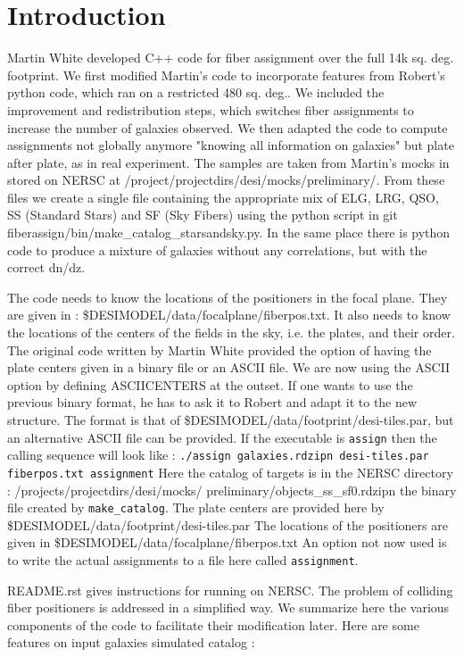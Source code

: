 \documentclass[10pt]{extarticle}
\begin{document}
\section{Introduction}
\begin{multicols}{2}
Martin White developed C++ code for fiber assignment over the full 14k sq. deg. footprint.  We first modified Martin's code to incorporate features from Robert's python code, which ran on a restricted 480 sq. deg.. We included the improvement and redistribution steps, which switches fiber assignments to increase the number of galaxies observed. We then adapted the code to compute assignments not globally anymore "knowing all information on galaxies" but plate after plate, as in real experiment.
The samples are taken from Martin's mocks in stored on NERSC at /project/projectdirs/desi/mocks/preliminary/.  From these files we create a single file containing the appropriate mix of ELG, LRG, QSO, SS (Standard Stars) and SF (Sky Fibers) using the python script in git fiberassign/bin/make\_catalog\_starsandsky.py.  In the same place there is python code to produce a mixture of galaxies without any correlations, but with the correct dn/dz.  
  
  The code needs to know the locations of the positioners in the focal plane.  They are given in : \$DESIMODEL/data/focalplane/fiberpos.txt.
  It also needs to know the locations of the centers of the fields in the sky, i.e. the plates, and their order.  The original code written by Martin White provided the option of having the plate centers given in a binary file or an ASCII file.  We are now using the ASCII option by defining ASCIICENTERS at the outset.  If one wants to use the previous binary format, he has to ask it to Robert and adapt it to the new structure. The format is that of \$DESIMODEL/data/footprint/desi-tiles.par, but an alternative ASCII file can be provided. If the executable is {\tt assign} then the calling sequence will look like :
  {\tt./assign galaxies.rdzipn desi-tiles.par fiberpos.txt assignment}
 Here the catalog of targets is in the NERSC directory :
  /projects/projectdirs/desi/mocks/ preliminary/objects\_ss\_sf0.rdzipn the binary file created by {\tt make\_catalog}. The plate centers are provided here by \$DESIMODEL/data/footprint/desi-tiles.par The locations of the positioners are given in \$DESIMODEL/data/focalplane/fiberpos.txt An option not now used is to write the actual assignments to a file here called {\tt assignment}.
  
  
  README.rst gives instructions for running on NERSC. The problem of colliding fiber positioners is addressed in a simplified way. 
  We summarize here the various components of the code to facilitate their modification later.
Here are some features on input galaxies simulated catalog :


\end{multicols}
\end{document}
